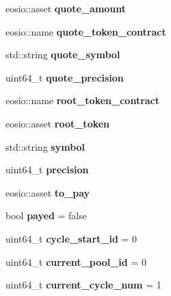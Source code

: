 \begin{DoxyCompactItemize}
eosio\+::asset {\bfseries quote\+\_\+amount}
\item 
\mbox{\label{structhosts_ad0543af217c9166111211df7e5ae4d10}} 
eosio\+::name {\bfseries quote\+\_\+token\+\_\+contract}
\item 
\mbox{\label{structhosts_ac89780b3abc69a5a15bd23e3f0a87636}} 
std\+::string {\bfseries quote\+\_\+symbol}
\item 
\mbox{\label{structhosts_ab8357e7bc7d53e0234c7bb8fdd668dd3}} 
uint64\+\_\+t {\bfseries quote\+\_\+precision}
\item 
\mbox{\label{structhosts_a68dab42c2847909f51b03a1c97fbb3b6}} 
eosio\+::name {\bfseries root\+\_\+token\+\_\+contract}
\item 
\mbox{\label{structhosts_ab25ffbf2b0edcccbc4e0a9cd5f9cd6b5}} 
eosio\+::asset {\bfseries root\+\_\+token}
\item 
\mbox{\label{structhosts_a17c085f318a91d470a0f7b32e8c36dcd}} 
std\+::string {\bfseries symbol}
\item 
\mbox{\label{structhosts_ac235bddf1a3a4ec7b326fdaf0539728f}} 
uint64\+\_\+t {\bfseries precision}
\item 
\mbox{\label{structhosts_a4692b62c2bf0a73bfc98fd3b3e20cfb1}} 
eosio\+::asset {\bfseries to\+\_\+pay}
\item 
\mbox{\label{structhosts_a8256089a682ad0c46f9deca1478450e1}} 
bool {\bfseries payed} = false
\item 
\mbox{\label{structhosts_a18b42ecfa193db770fa4226dd6e82b0d}} 
uint64\+\_\+t {\bfseries cycle\+\_\+start\+\_\+id} = 0
\item 
\mbox{\label{structhosts_a2d82a264c4140047d7c1910c5688e433}} 
uint64\+\_\+t {\bfseries current\+\_\+pool\+\_\+id} = 0
\item 
\mbox{\label{structhosts_a0bffc7f8877a3c5d8e21d9d427ce2cd1}} 
uint64\+\_\+t {\bfseries current\+\_\+cycle\+\_\+num} = 1

\end{DoxyCompactItemize}
